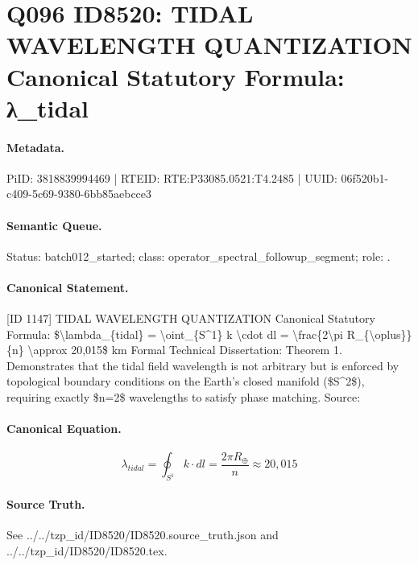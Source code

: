 \section*{Q096 ID8520: TIDAL WAVELENGTH QUANTIZATION Canonical Statutory Formula: λ\_tidal}
\paragraph{Metadata.}
PiID: 3818839994469 | RTEID: RTE:P33085.0521:T4.2485 | UUID: 06f520b1-c409-5c69-9380-6bb85aebcce3

\paragraph{Semantic Queue.}
Status: batch012\_started; class: operator\_spectral\_followup\_segment; role: .

\paragraph{Canonical Statement.}
[ID 1147] TIDAL WAVELENGTH QUANTIZATION Canonical Statutory Formula: \$\textbackslash{}lambda\_\{tidal\} = \textbackslash{}oint\_\{S\textasciicircum{}1\} k \textbackslash{}cdot dl = \textbackslash{}frac\{2\textbackslash{}pi R\_\{\textbackslash{}oplus\}\}\{n\} \textbackslash{}approx 20,015\$ km Formal Technical Dissertation: Theorem 1. Demonstrates that the tidal field wavelength is not arbitrary but is enforced by topological boundary conditions on the Earth's closed manifold (\$S\textasciicircum{}2\$), requiring exactly \$n=2\$ wavelengths to satisfy phase matching. Source:

\paragraph{Canonical Equation.}
\[
\lambda_{tidal} = \oint_{S^1} k \cdot dl = \frac{2\pi R_{\oplus}}{n} \approx 20,015
\]

\paragraph{Source Truth.}
See ../../tzp\_id/ID8520/ID8520.source\_truth.json and ../../tzp\_id/ID8520/ID8520.tex.
